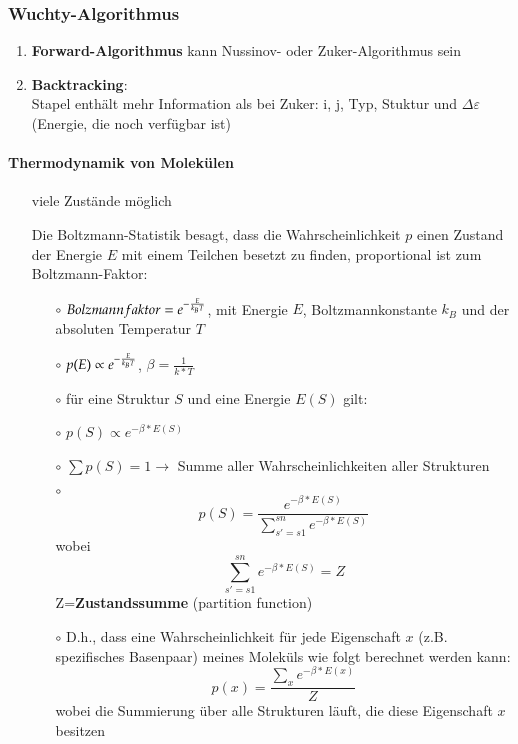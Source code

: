 \subsubsection{Wuchty-Algorithmus}
\begin{enumerate}
\item\textbf{Forward-Algorithmus} kann Nussinov- oder Zuker-Algorithmus sein
\item\textbf{Backtracking}:\\
Stapel enth\"alt mehr Information als bei Zuker:  i, j, Typ, Stuktur und $\Delta\varepsilon$ (Energie, die noch verf\"ugbar ist)
\end{enumerate}
\paragraph{Thermodynamik von Molek\"ulen}
\begin{itemize}
\item[]viele Zust\"ande m\"oglich
\item[]Die Boltzmann-Statistik besagt, dass die Wahrscheinlichkeit $p$ einen Zustand der Energie $E$ mit einem Teilchen besetzt zu finden, proportional ist zum Boltzmann-Faktor:
	\begin{itemize}
	\item[$\circ$]$Bolzmannfaktor=e^{-\frac{E}{k_B\*T}} $, mit Energie $E$, Boltzmannkonstante $k_B$ und der absoluten Temperatur $T$
	\item[$\circ$]$p(E)\propto e^{-\frac{E}{k_B\*T}}$, $\beta=\frac{1}{k*T}$
	\item[$\circ$]f\"ur eine Struktur $S$ und eine Energie $E(S)$ gilt:
	\item[$\circ$]$p(S)\propto e^{-\beta*E(S)}$
	\item[$\circ$]$\sum p(S) = 1 \rightarrow$ Summe aller Wahrscheinlichkeiten aller Strukturen
	\item[$\circ$]\begin{equation}
	p(S)= \frac{e^{-\beta*E(S)}}{\sum \limits_{s'=s1}^{sn} e^{-\beta*E(S)}}
	\end{equation}wobei \begin{equation}
	\sum \limits_{s'=s1}^{sn} e^{-\beta*E(S)}=Z
	\end{equation}Z=\textbf{Zustandssumme} (partition function)
	\item[$\circ$] D.h., dass eine Wahrscheinlichkeit f\"ur jede Eigenschaft $x$ (z.B. spezifisches Basenpaar) meines Molek\"uls wie folgt berechnet werden kann: \begin{equation}
	p(x)=\frac{\sum \limits_{x}  e^{-\beta*E(x)}}{Z}
	\end{equation}
	wobei die Summierung über alle Strukturen l\"auft, die diese Eigenschaft $x$ besitzen
	\end{itemize}
\end{itemize}




